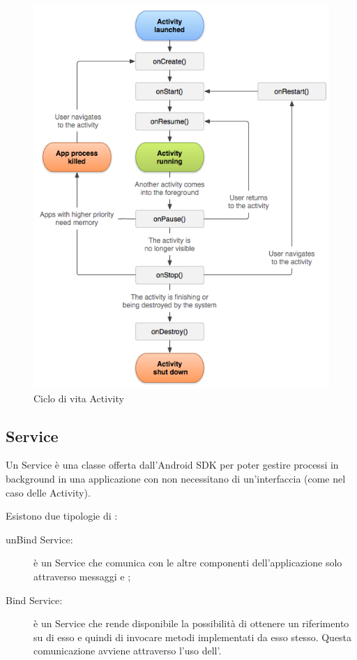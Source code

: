 \documentclass[../ManualeSviluppatore.tex]{subfiles}
\begin{document}
\begin{appendices}
				\begin{figure} [p]
					\centering
					\includegraphics[width=\textwidth]{img/ActivityCiclo}
					\caption{Ciclo di vita Activity}
					\label{fig:ActivityCiclo}
				\end{figure}
			
		\subsection{Service}
			Un Service è una classe offerta dall'Android SDK per poter gestire processi in background in una applicazione con non necessitano di un'interfaccia (come nel caso delle Activity).
		
		Esistono due tipologie di \Service:
			\begin{description}
				\item [unBind Service:] è un Service che comunica con le altre componenti dell'applicazione solo attraverso messaggi \Intent e \BroadcastReceiver;
				\item [Bind Service:] è un Service che rende disponibile la possibilità di ottenere un riferimento su di esso e quindi di invocare metodi implementati da esso stesso. Questa comunicazione avviene attraverso l'uso dell'\IBinder.
			\end{description}
		

\end{appendices}
\end{document}

